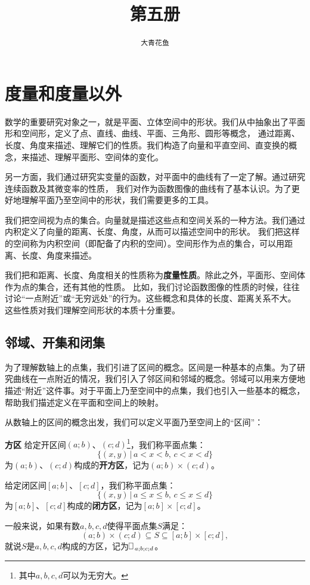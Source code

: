 \documentclass[12pt,UTF8]{ctexbook}
\title{\zihao{0} \bfseries 第五册}
\author{\zihao{2} \texttt{大青花鱼}}
\date{}
\begin{document}
\maketitle
\tableofcontents
\newpage

\chapter{度量和度量以外}

数学的重要研究对象之一，就是平面、立体空间中的形状。我们从中抽象出了平面形和空间形，定义了点、直线、曲线、平面、三角形、圆形等概念，
通过距离、长度、角度来描述、理解它们的性质。我们构造了向量和平直空间、直变换的概念，来描述、理解平面形、空间体的变化。

另一方面，我们通过研究实变量的函数，对平面中的曲线有了一定了解。通过研究连续函数及其微变率的性质，
我们对作为函数图像的曲线有了基本认识。为了更好地理解平面乃至空间中的形状，我们需要更多的工具。

我们把空间视为点的集合。向量就是描述这些点和空间关系的一种方法。我们通过内积定义了向量的距离、长度、角度，从而可以描述空间中的形状。
我们把这样的空间称为内积空间（即配备了内积的空间）。空间形作为点的集合，可以用距离、长度、角度来描述。

我们把和距离、长度、角度相关的性质称为\textbf{度量性质}。除此之外，平面形、空间体作为点的集合，还有其他的性质。
比如，我们讨论函数图像的性质的时候，往往讨论“一点附近”或“无穷远处”的行为。这些概念和具体的长度、距离关系不大。
这些性质对我们理解空间形状的本质十分重要。

\section{邻域、开集和闭集}

为了理解数轴上的点集，我们引进了区间的概念。区间是一种基本的点集。为了研究曲线在一点附近的情况，我们引入了邻区间和邻域的概念。邻域可以用来方便地描述“附近”这件事。对于平面上乃至空间中的点集，我们也引入一些基本的概念，帮助我们描述定义在平面和空间上的映射。

从数轴上的区间的概念出发，我们可以定义平面乃至空间上的“区间”：

\begin{df}{\textbf{方区}}
    给定开区间$(a;b)$、$(c;d)$\footnote{其中$a,b,c,d$可以为无穷大。}，我们称平面点集：
    $$\{(x, y) \, | \, a < x < b,\, c< x < d\}$$
    为$(a;b)$、$(c;d)$构成的\textbf{开方区}，记为$(a;b)\times(c;d)$。

    给定闭区间$[a;b]$、$[c;d]$，我们称平面点集：
    $$\{(x, y) \, | \, a \leqslant x \leqslant b,\, c \leqslant x \leqslant d\}$$
    为$[a;b]$、$[c;d]$构成的\textbf{闭方区}，记为$[a;b]\times[c;d]$。

    一般来说，如果有数$a,b,c,d$使得平面点集$S$满足：
    $$(a;b)\times(c;d) \subseteq S \subseteq [a;b]\times[c;d],$$
    就说$S$是$a,b,c,d$构成的方区，记为$\rectbx_{a;b;c;d}$。

\end{df}
\end{document}
